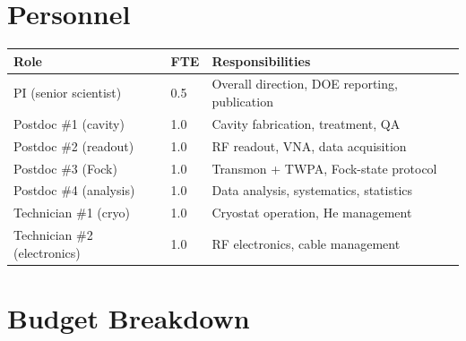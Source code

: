 \documentclass[11pt]{article}
\begin{document}
\section{Personnel}

\begin{center}
\renewcommand{\arraystretch}{1.2}
\begin{tabular}{@{}lll@{}}
\toprule
\textbf{Role} & \textbf{FTE} & \textbf{Responsibilities} \\
\midrule
PI (senior scientist) & 0.5 & Overall direction, DOE reporting,
  publication \\
Postdoc \#1 (cavity) & 1.0 & Cavity fabrication, treatment, QA \\
Postdoc \#2 (readout) & 1.0 & RF readout, VNA, data acquisition \\
Postdoc \#3 (Fock) & 1.0 & Transmon + TWPA, Fock-state protocol \\
Postdoc \#4 (analysis) & 1.0 & Data analysis, systematics, statistics \\
Technician \#1 (cryo) & 1.0 & Cryostat operation, He management \\
Technician \#2 (electronics) & 1.0 & RF electronics, cable management \\
\bottomrule
\end{tabular}
\end{center}


\section{Budget Breakdown}
\end{document}
